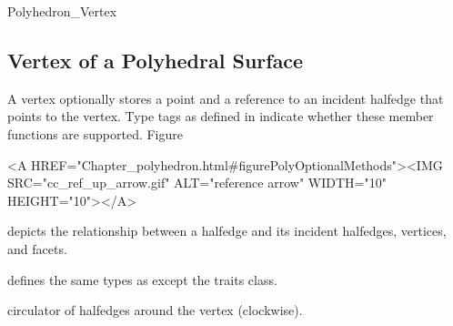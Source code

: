 \begin{ccClass}{Polyhedron_Vertex}
\subsection{Vertex of a Polyhedral Surface}

\ccDefinition

A vertex optionally stores a point and a reference to an incident
halfedge that points to the vertex.  Type tags  as defined in
 indicate whether these
member functions are supported.  
Figure~\ccTexHtml{\ref{figurePolyOptionalMethods}}{}\begin{ccHtmlOnly}
  <A HREF="Chapter_polyhedron.html#figurePolyOptionalMethods"><IMG 
  SRC="cc_ref_up_arrow.gif" ALT="reference arrow" WIDTH="10" HEIGHT="10"></A>
\end{ccHtmlOnly}
depicts the relationship between a halfedge and its incident halfedges,
vertices, and facets.


\ccTypes
{}
\ccThreeToTwo

 defines the same types as  except
the traits class.


\ccGlue
{}

    {circulator of halfedges around the vertex (clockwise).}

\end{ccClass}



